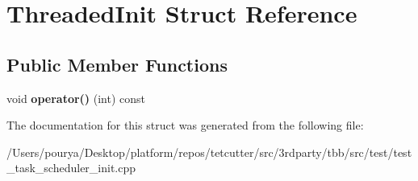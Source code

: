 \hypertarget{structThreadedInit}{}\section{Threaded\+Init Struct Reference}
\label{structThreadedInit}
\subsection*{Public Member Functions}
\begin{DoxyCompactItemize}
\item 
\hypertarget{structThreadedInit_a4948dc5bf1053faf701ffc7d8941764d}{}void {\bfseries operator()} (int) const \label{structThreadedInit_a4948dc5bf1053faf701ffc7d8941764d}

\end{DoxyCompactItemize}


The documentation for this struct was generated from the following file\+:\begin{DoxyCompactItemize}
\item 
/\+Users/pourya/\+Desktop/platform/repos/tetcutter/src/3rdparty/tbb/src/test/test\+\_\+task\+\_\+scheduler\+\_\+init.\+cpp\end{DoxyCompactItemize}

